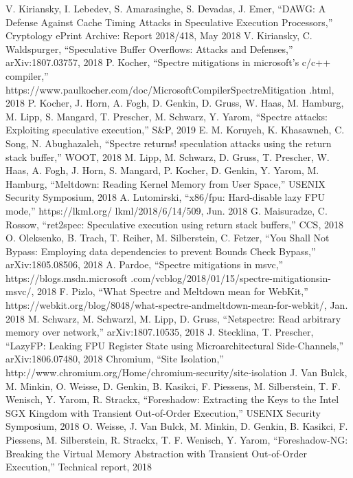 \begin{thebibliography}{00}
     V. Kiriansky, I. Lebedev, S. Amarasinghe, S. Devadas, J. Emer, ``DAWG: A Defense Against Cache Timing Attacks in Speculative Execution Processors,'' Cryptology ePrint Archive: Report 2018/418, May 2018
     V. Kiriansky, C. Waldspurger, ``Speculative Buffer Overflows: Attacks and Defenses,'' arXiv:1807.03757, 2018
     P. Kocher, ``Spectre mitigations in microsoft’s c/c++ compiler,'' https://www.paulkocher.com/doc/MicrosoftCompilerSpectreMitigation .html, 2018
     P. Kocher, J. Horn, A. Fogh, D. Genkin, D. Gruss, W. Haas, M. Hamburg, M. Lipp, S. Mangard, T. Prescher, M. Schwarz, Y. Yarom, ``Spectre attacks: Exploiting speculative execution,'' S\&P, 2019
     E. M. Koruyeh, K. Khasawneh, C. Song, N. Abughazaleh, ``Spectre returns! speculation attacks using the return stack buffer,'' WOOT, 2018
     M. Lipp, M. Schwarz, D. Gruss, T. Prescher, W. Haas, A. Fogh, J. Horn, S. Mangard, P. Kocher, D. Genkin, Y. Yarom, M. Hamburg, ``Meltdown: Reading Kernel Memory from User Space,'' USENIX Security Symposium, 2018
     A. Lutomirski, ``x86/fpu: Hard-disable lazy FPU mode,'' https://lkml.org/ lkml/2018/6/14/509, Jun. 2018
     G. Maisuradze, C. Rossow, ``ret2spec: Speculative execution using return stack buffers,'' CCS, 2018
     O. Oleksenko, B. Trach, T. Reiher, M. Silberstein, C. Fetzer, ``You Shall Not Bypass: Employing data dependencies to prevent Bounds Check Bypass,'' arXiv:1805.08506, 2018
     A. Pardoe, ``Spectre mitigations in msvc,'' https://blogs.msdn.microsoft .com/vcblog/2018/01/15/spectre-mitigationsin-msvc/, 2018
     F. Pizlo, ``What Spectre and Meltdown mean for WebKit,'' https://webkit.org/blog/8048/what-spectre-andmeltdown-mean-for-webkit/, Jan. 2018
     M. Schwarz, M. Schwarzl, M. Lipp, D. Gruss, ``Netspectre: Read arbitrary memory over network,'' arXiv:1807.10535, 2018
     J. Stecklina, T. Prescher, ``LazyFP: Leaking FPU Register State using Microarchitectural Side-Channels,'' arXiv:1806.07480, 2018
     Chromium, ``Site Isolation,'' http://www.chromium.org/Home/chromium-security/site-isolation
     J. Van Bulck, M. Minkin, O. Weisse, D. Genkin, B. Kasikci, F. Piessens, M. Silberstein, T. F. Wenisch, Y. Yarom, R. Strackx, ``Foreshadow: Extracting the Keys to the Intel SGX Kingdom with Transient Out-of-Order Execution,'' USENIX Security Symposium, 2018
     O. Weisse, J. Van Bulck, M. Minkin, D. Genkin, B. Kasikci, F. Piessens, M. Silberstein, R. Strackx, T. F. Wenisch, Y. Yarom, ``Foreshadow-NG: Breaking the Virtual Memory Abstraction with Transient Out-of-Order Execution,'' Technical report, 2018

\end{thebibliography}
